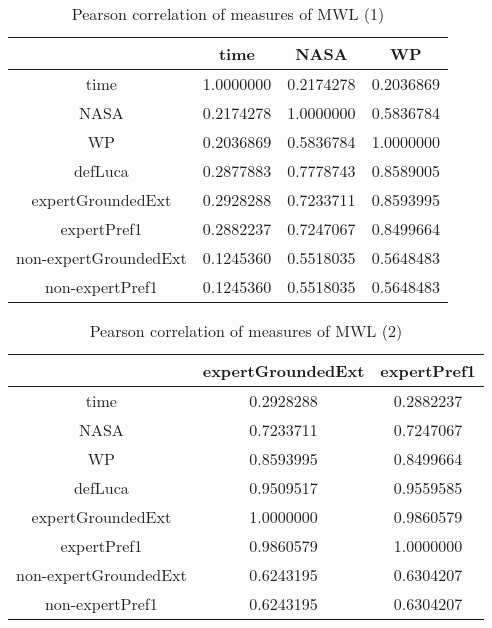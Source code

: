 \begin{table}[!htbp]
\centering
\begin{tabular}{|c|c|c|c|}
\hline
                 &  time     & NASA      &  WP        \\ \hline
time             & 1.0000000 & 0.2174278 & 0.2036869  \\
NASA             & 0.2174278 & 1.0000000 & 0.5836784 \\
WP               & 0.2036869 & 0.5836784 & 1.0000000 \\
defLuca          & 0.2877883 & 0.7778743 & 0.8589005 \\
expertGroundedExt  & 0.2928288 & 0.7233711 & 0.8593995 \\
expertPref1        & 0.2882237 & 0.7247067 & 0.8499664 \\
non-expertGroundedExt & 0.1245360 & 0.5518035 & 0.5648483 \\
non-expertPref1       & 0.1245360 & 0.5518035 & 0.5648483 \\
\hline
\end{tabular}
\caption{Pearson correlation of measures of MWL (1)}
\label{tab:corrmwlone}
\end{table}

\begin{table}[!htbp]
\centering
\begin{tabular}{|c|c|c|}
\hline
                 & expertGroundedExt & expertPref1 \\ \hline
time             & 0.2928288 & 0.2882237        \\
NASA             & 0.7233711 & 0.7247067        \\
WP               & 0.8593995 & 0.8499664        \\
defLuca          & 0.9509517 & 0.9559585        \\
expertGroundedExt  & 1.0000000 & 0.9860579         \\
expertPref1        & 0.9860579 & 1.0000000        \\
non-expertGroundedExt & 0.6243195 & 0.6304207        \\
non-expertPref1       & 0.6243195 & 0.6304207        \\
\hline
\end{tabular}
\caption{Pearson correlation of measures of MWL (2)}
\label{tab:corrmwltwo}
\end{table}

